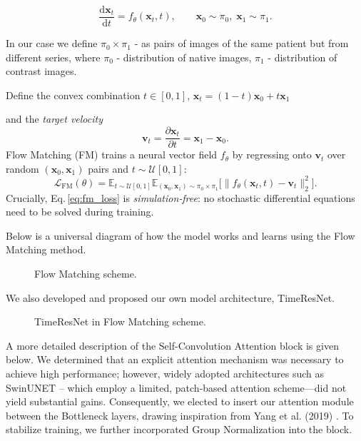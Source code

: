 \documentclass{article}
\begin{document}
\begin{equation}
\frac{\mathrm{d}\mathbf{x}_{t}}{\mathrm{d}t}=f_{\theta}(\mathbf{x}_{t},t),
\qquad
\mathbf{x}_{0}\sim\pi_{0},\;
\mathbf{x}_{1}\sim\pi_{1}.
\label{eq:flow_ode}
\end{equation}

In our case we define $\pi_{0}\!\times\!\pi_{1}$ - as pairs of images of the same patient but from different series, where $\pi_{0}$ - distribution of native images, $\pi_{1}$ - distribution of contrast images.

Define the convex combination $t \in [0, 1]$, $\mathbf{x}_{t}=(1-t)\mathbf{x}_{0}+t\mathbf{x}_{1}$ \label{eq:linear_combination}

and the
\emph{target velocity}
%
\begin{equation}
\mathbf{v}_t
      =\frac{\partial\mathbf{x}_{t}}{\partial t}
      =\mathbf{x}_{1}-\mathbf{x}_{0}.
\label{eq:target_vel}
\end{equation}
%
Flow Matching (FM) trains a neural vector field
$f_{\theta}$ by regressing onto $\mathbf{v}_{t}$
over random $(\mathbf{x}_{0},\mathbf{x}_{1})$ pairs and
$t\!\sim\!\mathcal{U}[0,1]$:
%
\begin{equation}
\mathcal{L}_{\mathrm{FM}}(\theta)=
\mathbb{E}_{t \sim \mathcal{U}[0,1]}\mathbb{E}_{(\mathbf{x}_{0},\mathbf{x}_{1}) \sim \pi_{0} \times \pi_{1}}
\bigl[
\lVert f_{\theta}(\mathbf{x}_{t},t)-
       \mathbf{v}_{t}\rVert_{2}^{2}
\bigr].
\label{eq:fm_loss}
\end{equation}
%
Crucially, Eq.\,\eqref{eq:fm_loss} is \emph{simulation‑free}: no stochastic differential equations need to be solved during training.

Below is a universal diagram of how the model works and learns using the Flow Matching method.

\begin{figure}[h!]
  \centering
  \caption{Flow Matching scheme.}
\end{figure}

We also developed and proposed our own model architecture, TimeResNet.

\begin{figure}[h!]
  \centering
  \caption{TimeResNet in Flow Matching scheme.}
\end{figure}

A more detailed description of the Self-Convolution Attention block is given below. We determined that an explicit attention mechanism was necessary to achieve high performance; however, widely adopted architectures such as SwinUNET \citep{cao2022swin} -- which employ a limited, patch-based attention scheme—did not yield substantial gains. Consequently, we elected to insert our attention module between the Bottleneck layers, drawing inspiration from Yang et al. (2019) \citep{yang-etal-2019-convolutional}. To stabilize training, we further incorporated Group Normalization \citep{wu2018group} into the block.
\end{document}
